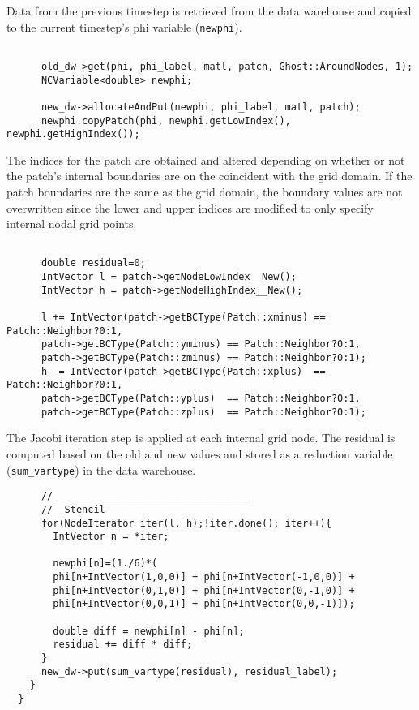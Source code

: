 \documentclass[11pt,fleqn]{book} %
\begin{document}
    Data from the previous timestep is retrieved from the data warehouse
    and copied to the current timestep's phi variable (\texttt{newphi}).

    \begin{lstlisting}

      old_dw->get(phi, phi_label, matl, patch, Ghost::AroundNodes, 1);
      NCVariable<double> newphi;

      new_dw->allocateAndPut(newphi, phi_label, matl, patch);
      newphi.copyPatch(phi, newphi.getLowIndex(), newphi.getHighIndex());

    \end{lstlisting}

    The indices for the patch are obtained and altered depending on
    whether or not the patch's internal boundaries are on the coincident
    with the grid domain.  If the patch boundaries are the same as the
    grid domain, the boundary values are not overwritten since the lower
    and upper indices are modified to only specify internal nodal grid
    points.



    \begin{lstlisting}

      double residual=0;
      IntVector l = patch->getNodeLowIndex__New();
      IntVector h = patch->getNodeHighIndex__New();

      l += IntVector(patch->getBCType(Patch::xminus) == Patch::Neighbor?0:1,
      patch->getBCType(Patch::yminus) == Patch::Neighbor?0:1,
      patch->getBCType(Patch::zminus) == Patch::Neighbor?0:1);
      h -= IntVector(patch->getBCType(Patch::xplus)  == Patch::Neighbor?0:1,
      patch->getBCType(Patch::yplus)  == Patch::Neighbor?0:1,
      patch->getBCType(Patch::zplus)  == Patch::Neighbor?0:1);

    \end{lstlisting}

    The Jacobi iteration step is applied at each internal grid node.  The
    residual is computed based on the old and new values and stored as a
    reduction variable (\texttt{sum\_vartype}) in the data warehouse.

    \begin{lstlisting}
      //__________________________________
      //  Stencil
      for(NodeIterator iter(l, h);!iter.done(); iter++){
        IntVector n = *iter;

        newphi[n]=(1./6)*(
        phi[n+IntVector(1,0,0)] + phi[n+IntVector(-1,0,0)] +
        phi[n+IntVector(0,1,0)] + phi[n+IntVector(0,-1,0)] +
        phi[n+IntVector(0,0,1)] + phi[n+IntVector(0,0,-1)]);

        double diff = newphi[n] - phi[n];
        residual += diff * diff;
      }
      new_dw->put(sum_vartype(residual), residual_label);
    }
  }

\end{lstlisting}
\end{document}
